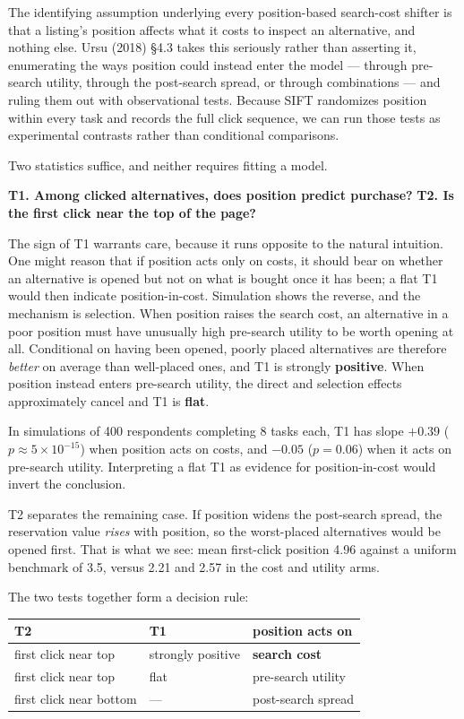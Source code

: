 \documentclass[
  letterpaper,
  DIV=11,
  numbers=noendperiod]{scrartcl}
\newcounter{none} %
\begin{document}
The identifying assumption underlying every position-based search-cost
shifter is that a listing's position affects what it costs to inspect an
alternative, and nothing else. Ursu (2018) §4.3 takes this seriously
rather than asserting it, enumerating the ways position could instead
enter the model --- through pre-search utility, through the post-search
spread, or through combinations --- and ruling them out with
observational tests. Because SIFT randomizes position within every task
and records the full click sequence, we can run those tests as
experimental contrasts rather than conditional comparisons.

Two statistics suffice, and neither requires fitting a model.

\textbf{T1. Among clicked alternatives, does position predict purchase?}
\textbf{T2. Is the first click near the top of the page?}

The sign of T1 warrants care, because it runs opposite to the natural
intuition. One might reason that if position acts only on costs, it
should bear on whether an alternative is opened but not on what is
bought once it has been; a flat T1 would then indicate position-in-cost.
Simulation shows the reverse, and the mechanism is selection. When
position raises the search cost, an alternative in a poor position must
have unusually high pre-search utility to be worth opening at all.
Conditional on having been opened, poorly placed alternatives are
therefore \emph{better} on average than well-placed ones, and T1 is
strongly \textbf{positive}. When position instead enters pre-search
utility, the direct and selection effects approximately cancel and T1 is
\textbf{flat}.

In simulations of 400 respondents completing 8 tasks each, T1 has slope
\(+0.39\) (\(p \approx 5\times10^{-15}\)) when position acts on costs,
and \(-0.05\) (\(p = 0.06\)) when it acts on pre-search utility.
Interpreting a flat T1 as evidence for position-in-cost would invert the
conclusion.

T2 separates the remaining case. If position widens the post-search
spread, the reservation value \emph{rises} with position, so the
worst-placed alternatives would be opened first. That is what we see:
mean first-click position 4.96 against a uniform benchmark of 3.5,
versus 2.21 and 2.57 in the cost and utility arms.

The two tests together form a decision rule:

{\def\LTcaptype{none} %
\begin{longtable}[]{@{}lll@{}}
\toprule\noalign{}
T2 & T1 & position acts on \\
\midrule\noalign{}
\endhead
\bottomrule\noalign{}
\endlastfoot
first click near top & strongly positive & \textbf{search cost} \\
first click near top & flat & pre-search utility \\
first click near bottom & --- & post-search spread \\
\end{longtable}
}
\end{document}
